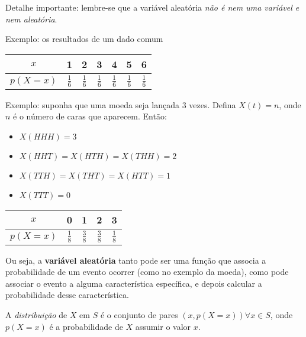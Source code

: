 \documentclass{article}
\begin{document}
\begin{enumerate}
        Detalhe importante: lembre-se que a variável aleatória \textit{não é nem uma variável e nem aleatória}.

        Exemplo: os resultados de um dado comum

        \begin{center}
            \begin{tabular}{ c | c c c c c c } 
                \( x \)  & 1  & 2  & 3 & 4 & 5 & 6  \\ [0.5ex] 
                \hline
                \( p(X = x) \) & \( \frac{1}{6}  \) & \( \frac{1}{6}  \) & \( \frac{1}{6}  \) & \( \frac{1}{6}  \) & \( \frac{1}{6}  \) & \( \frac{1}{6}  \) \\
            \end{tabular}
        \end{center}

        Exemplo: suponha que uma moeda seja lançada 3 vezes. Defina \( X(t) = n \), onde \( n \) é o número de caras que aparecem. Então:

        \begin{itemize}
            \item \( X(HHH) = 3 \)
            \item \( X(HHT) = X(HTH) = X(THH) = 2 \)
            \item \( X(TTH) = X(THT) = X(HTT) = 1 \)
            \item \( X(TTT) = 0 \)
        \end{itemize}

        \begin{center}
            \begin{tabular}{ c | c c c c } 
                \( x \) & 0 & 1  & 2  & 3 \\ [0.5ex] 
                \hline
                \( p(X = x) \) & \( \frac{1}{8}  \) & \( \frac{3}{8}  \) & \( \frac{3}{8}  \) & \( \frac{1}{8} \) \\
            \end{tabular}
        \end{center}

        Ou seja, a \textbf{variável aleatória} tanto pode ser uma função que associa a probabilidade de um evento ocorrer (como no exemplo da moeda), como pode associar o evento a alguma característica específica, e depois calcular a probabilidade desse característica.

        A \textit{distribuição} de \( X \) em \( S \) é o conjunto de pares \( (x,p(X=x)) \forall x \in S\), onde \( p(X=x) \) é a probabilidade de \( X \) assumir o valor \( x \).



\end{enumerate}
\end{document}
